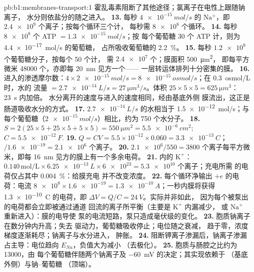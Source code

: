 \begin{solution}{pb:b1:membranes-transport:1}
霍乱毒素阻断了其他途径；氯离子在电性上跟随钠离子，
水分则依盐分的随之进入。
\textbf{13.} 每秒 $\qty{4e-15}{mol/s}$ 的 $\mathrm{Na^+}$，即
$\num{2.4e9}$ 个离子；按每个循环三个计，
每秒需 $\num{8e8}$ 个循环。
\textbf{14.} 每秒 $\num{8e8}$ 个 ATP $= \qty{1.3e-15}{mol/s}$；按
每个葡萄糖 30 个 ATP 计，则为 \qty{4.4e-17}{mol/s} 的葡萄糖，
占所吸收葡萄糖的 \qty{2.2}{\%}。
\textbf{15.} 每秒 $\num{1.2e9}$ 个葡萄糖分子，按每个 50 个计，
需 $\num{2.4e7}$ 个；膜面积 \qty{500}{\micro m^2}，
即每平方微米 \num{48000} 个，亦即每 \qty{20}{nm} 见方一个——
一层转运体排列十分密集的膜。
\textbf{16.} 进入的渗透摩尔数：$4\times\qty{2e-15}{mol/s} =
\qty{8e-15}{osmol/s}$；在 \qty{0.3}{osmol/L} 时，水的
流量 $= \qty{2.7e-14}{L/s} = \qty{27}{\micro m^3/s}$。体积
$25\times 5\times 5 = \qty{625}{\micro m^3}$：\qty{23}{s} 内加倍。
水分离开的速度与进入的速度相同，经由基底外侧
膜流出，这正是肠道吸收水分的方式。
\textbf{17.} $\qty{2.7e-14}{L/s}$ 的水相当于 \qty{1.5e-12}{mol/s}；与每个葡萄糖（$\qty{2e-15}{mol/s}$）相比，约为 750 个水分子。
\textbf{18.} $S = 2(25\times 5 + 25\times 5 + 5\times 5) =
\qty{550}{\micro m^2} = \qty{5.5e-6}{cm^2}$; $C = \qty{5.5e-12}{F}$.
\textbf{19.} $Q = CV = 5.5\times 10^{-12}\times 0.060 =
\qty{3.3e-13}{C}$；$/\num{1.6e-19} = \num{2.1e6}$ 个离子。
\textbf{20.} $\num{2.1e6}/550 = 3800$ 个离子每平方微米，即每 \qty{16}{nm} 见方的膜上有一个多余电荷。
\textbf{21.} 内的 $\mathrm{K^+}$：$0.140\,\mathrm{mol/L}\times
\qty{6.25e-13}{L}\times\num{6e23} = \num{5.3e10}$ 个离子；充电所需
的电荷仅占其中 \qty{0.004}{\%}：给膜充电
并不改变浓度。
\textbf{22.} 每个循环净输出 $+e$ 的电荷：电流 $\num{8e8}\times
\num{1.6e-19} = \qty{1.3e-10}{A}$；一秒内膜将获得
\qty{1.3e-10}{C} 的电荷，即 $\Delta V = Q/C = \qty{24}{V}$。实际并非如此，
因为每个被泵出的电荷都会立即被通过通道
回流的离子所平衡（主要是 $\mathrm{K^+}$ 内漏减少，
或 $\mathrm{Na^+}$ 重新进入）：膜的电导使
泵的电流短路，泵只造成毫伏级的变化。
\textbf{23.} 胞质钠离子在数分钟内升高；失去
驱动力，葡萄糖吸收停止；电位随之衰减，
趋于零，浓度梯度逐渐耗尽；钠离子与水分进入，
肿胀。
\textbf{24.} 阻断钾离子渗漏后，钠离子渗漏
占主导：电位趋向 $E_{Na}$，负值大为减小
（去极化）。
\textbf{25.} 胞质与肠腔之比约为 \num{13000}，由
每个葡萄糖伴随两个钠离子及 \qty{-60}{mV} 的决定；其实现依赖于
（基底外侧）与钠–葡萄糖
（顶端）。
\end{solution}
